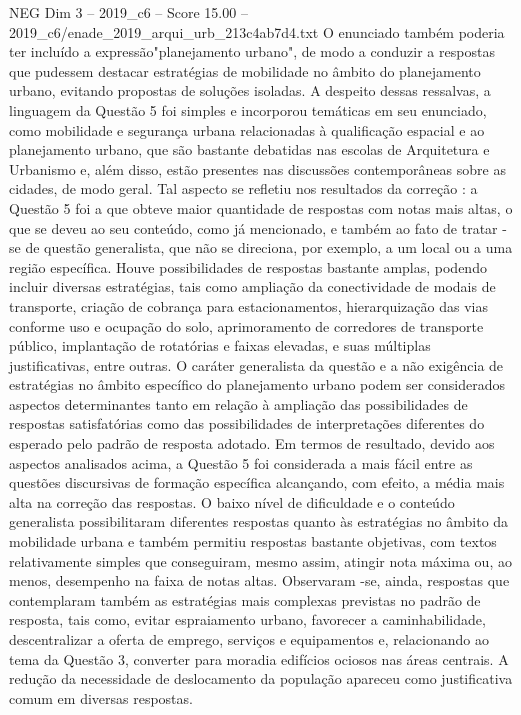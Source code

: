 \begin{textsample}{NEG Dim 3 – 2019\_c6 – Score 15.00 – 2019\_c6/enade\_2019\_arqui\_urb\_213c4ab7d4.txt}
O enunciado também poderia ter incluído a expressão"planejamento urbano", de modo a conduzir a respostas que pudessem destacar estratégias de mobilidade no âmbito do planejamento urbano, evitando propostas de soluções isoladas.
A despeito dessas ressalvas, a linguagem da Questão 5 foi simples e incorporou temáticas em seu enunciado, como mobilidade e segurança urbana relacionadas à qualificação espacial e ao planejamento urbano, que são bastante debatidas nas escolas de Arquitetura e Urbanismo e, além disso, estão presentes nas discussões contemporâneas sobre as cidades, de modo geral.
Tal aspecto se refletiu nos resultados da correção : a Questão 5 foi a que obteve maior quantidade de respostas com notas mais altas, o que se deveu ao seu conteúdo, como já mencionado, e também ao fato de tratar -se de questão generalista, que não se direciona, por exemplo, a um local ou a uma região específica.
Houve possibilidades de respostas bastante amplas, podendo incluir diversas estratégias, tais como ampliação da conectividade de modais de transporte, criação de cobrança para estacionamentos, hierarquização das vias conforme uso e ocupação do solo, aprimoramento de corredores de transporte público, implantação de rotatórias e faixas elevadas, e suas múltiplas justificativas, entre outras.
O caráter generalista da questão e a não exigência de estratégias no âmbito específico do planejamento urbano podem ser considerados aspectos determinantes tanto em relação à ampliação das possibilidades de respostas satisfatórias como das possibilidades de interpretações diferentes do esperado pelo padrão de resposta adotado.
Em termos de resultado, devido aos aspectos analisados acima, a Questão 5 foi considerada a mais fácil entre as questões discursivas de formação específica alcançando, com efeito, a média mais alta na correção das respostas.
O baixo nível de dificuldade e o conteúdo generalista possibilitaram diferentes respostas quanto às estratégias no âmbito da mobilidade urbana e também permitiu respostas bastante objetivas, com textos relativamente simples que conseguiram, mesmo assim, atingir nota máxima ou, ao menos, desempenho na faixa de notas altas.
Observaram -se, ainda, respostas que contemplaram também as estratégias mais complexas previstas no padrão de resposta, tais como, evitar espraiamento urbano, favorecer a caminhabilidade, descentralizar a oferta de emprego, serviços e equipamentos e, relacionando ao tema da Questão 3, converter para moradia edifícios ociosos nas áreas centrais.
A redução da necessidade de deslocamento da população apareceu como justificativa comum em diversas respostas.

\end{textsample}
